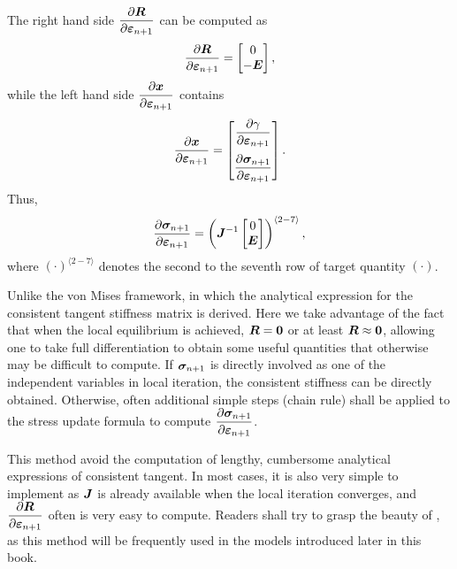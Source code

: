 The right hand side $\dfrac{\partial{\bm{R}}}{\partial{\bm{\varepsilon}_{n+1}}}$ can be computed as
\begin{gather}
\dfrac{\partial{\bm{R}}}{\partial{\bm{\varepsilon}_{n+1}}}=\begin{bmatrix}
0\\
-\bm{E}
\end{bmatrix},
\end{gather}
while the left hand side $\dfrac{\partial{\bm{x}}}{\partial{\bm{\varepsilon}_{n+1}}}$ contains
\begin{gather}
\dfrac{\partial{\bm{x}}}{\partial{\bm{\varepsilon}_{n+1}}}=\begin{bmatrix}
\dfrac{\partial{\gamma}}{\partial{\bm{\varepsilon}_{n+1}}}\\[4mm]
\dfrac{\partial{\bm{\sigma}_{n+1}}}{\partial{\bm{\varepsilon}_{n+1}}}
\end{bmatrix}.
\end{gather}
Thus,
\begin{gather}
\dfrac{\partial{\bm{\sigma}_{n+1}}}{\partial{\bm{\varepsilon}_{n+1}}}=\left(\bm{J}^{-1}\begin{bmatrix}
0\\
\bm{E}
\end{bmatrix}\right)^{\langle2-7\rangle},
\end{gather}
where $\left(\cdot\right)^{\langle2-7\rangle}$ denotes the second to the seventh row of target quantity $\left(\cdot\right)$.

Unlike the von Mises framework, in which the analytical expression for the consistent tangent stiffness matrix is derived. Here we take advantage of the fact that when the local equilibrium is achieved, $\bm{R}=\bm{0}$ or at least $\bm{R}\approx\bm{0}$, allowing one to take full differentiation to obtain some useful quantities that otherwise may be difficult to compute. If $\bm{\sigma}_{n+1}$ is directly involved as one of the independent variables in local iteration, the consistent stiffness can be directly obtained. Otherwise, often additional simple steps (chain rule) shall be applied to the stress update formula to compute $\dfrac{\partial{\bm{\sigma}_{n+1}}}{\partial{\bm{\varepsilon}_{n+1}}}$.

This method avoid the computation of lengthy, cumbersome analytical expressions of consistent tangent. In most cases, it is also very simple to implement as $\bm{J}$ is already available when the local iteration converges, and $\dfrac{\partial{\bm{R}}}{\partial{\bm{\varepsilon}_{n+1}}}$ often is very easy to compute. Readers shall try to grasp the beauty of , as this method will be frequently used in the models introduced later in this book.
